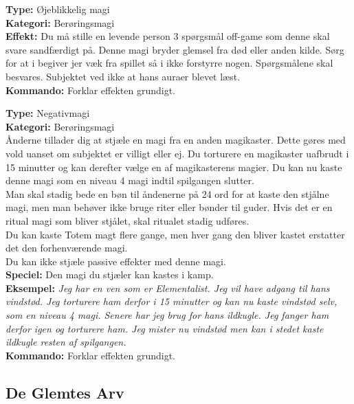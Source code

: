 \begin{meditation*}
\textbf{Type:} Øjeblikkelig magi\\
\textbf{Kategori:} Berøringsmagi\\
\textbf{Effekt:} Du må stille en levende person 3 spørgsmål off-game som denne skal svare sandfærdigt på. Denne magi bryder glemsel fra død eller anden kilde. Sørg for at i begiver jer væk fra spillet så i ikke forstyrre nogen. Spørgsmålene skal besvares. Subjektet ved ikke at hans auraer blevet læst.\\
\textbf{Kommando:} Forklar effekten grundigt.
\end{meditation*}

\begin{meditation*}
\textbf{Type:} Negativmagi \\
\textbf{Kategori:} Berøringsmagi\\
Ånderne tillader dig at stjæle en magi fra en anden magikaster. Dette gøres med vold uanset om subjektet er villigt eller ej. Du torturere en magikaster uafbrudt i 15 minutter og kan derefter vælge en
af magikasterens magier. Du kan nu kaste denne magi som en niveau 4 magi indtil spilgangen slutter.\\
Man skal stadig bede en bøn til åndenerne på 24 ord for at kaste den stjålne magi, men man behøver ikke bruge riter eller bønder til guder. Hvis det er en ritual magi som bliver stjålet, skal ritualet stadig udføres.\\
Du kan kaste Totem magt flere gange, men hver gang den bliver kastet erstatter det den
forhenværende magi.\\
Du kan ikke stjæle passive effekter med denne magi.\\
\textbf{Speciel:} Den magi du stjæler kan kastes i kamp.\\
\textbf{Eksempel:} \textit{Jeg har en ven som er Elementalist. Jeg vil have adgang til hans vindstød. Jeg torturere ham derfor i 15 minutter og kan nu kaste vindstød selv, som en niveau 4 magi. Senere har jeg brug for
hans ildkugle. Jeg fanger ham derfor igen og torturere ham. Jeg mister nu vindstød men kan i stedet kaste ildkugle resten af spilgangen.}\\
\textbf{Kommando:} Forklar effekten grundigt.
\end{meditation*}

\subsection*{De Glemtes Arv}

